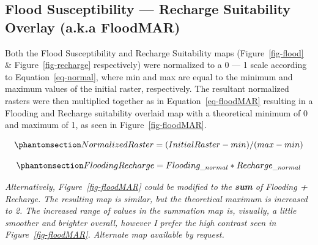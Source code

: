 \documentclass[
]{agujournal2019}
\begin{document}
\subsection{Flood Susceptibility --- Recharge Suitability Overlay (a.k.a
FloodMAR)}\label{flood-susceptibility-recharge-suitability-overlay-a.k.a-floodmar}

Both the Flood Susceptibility and Recharge Suitability maps
(Figure~\ref{fig-flood} \& Figure~\ref{fig-recharge} respectively) were
normalized to a 0 --- 1 scale according to Equation~\ref{eq-normal},
where min and max are equal to the minimum and maximum values of the
initial raster, respectively. The resultant normalized rasters were then
multiplied together as in Equation~\ref{eq-floodMAR} resulting in a
Flooding and Recharge suitability overlaid map with a theoretical
minimum of 0 and maximum of 1, as seen in Figure~\ref{fig-floodMAR}.

\begin{equation}\phantomsection\label{eq-normal}{
Normalized Raster = (Initial Raster - min)/(max - min)
}\end{equation}

\begin{equation}\phantomsection\label{eq-floodMAR}{
Flooding Recharge = Flooding_{\_normal} * Recharge_{\_normal}
}\end{equation}

\begin{tcolorbox}[enhanced jigsaw, colback=white, bottomtitle=1mm, breakable, arc=.35mm, coltitle=black, toptitle=1mm, left=2mm, titlerule=0mm, toprule=.15mm, colframe=quarto-callout-note-color-frame, title=\textcolor{quarto-callout-note-color}{\faInfo}\hspace{0.5em}{Note}, rightrule=.15mm, opacityback=0, bottomrule=.15mm, leftrule=.75mm, opacitybacktitle=0.6, colbacktitle=quarto-callout-note-color!10!white]

\emph{Alternatively, Figure~\ref{fig-floodMAR} could be modified to the
\textbf{sum} of Flooding \textbf{+} Recharge. The resulting map is
similar, but the theoretical maximum is increased to 2. The increased
range of values in the summation map is, visually, a little smoother and
brighter overall, however I prefer the high contrast seen in
Figure~\ref{fig-floodMAR}. Alternate map available by request.}

\end{tcolorbox}
\end{document}

